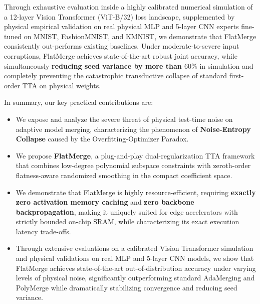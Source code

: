 Through exhaustive evaluation inside a highly calibrated numerical simulation of a 12-layer Vision Transformer (ViT-B/32) loss landscape, supplemented by physical empirical validation on real physical MLP and 5-layer CNN experts fine-tuned on MNIST, FashionMNIST, and KMNIST, we demonstrate that FlatMerge consistently out-performs existing baselines. 
Under moderate-to-severe input corruptions, FlatMerge achieves state-of-the-art robust joint accuracy, while simultaneously \textbf{reducing seed variance by more than $60\%$} in simulation and completely preventing the catastrophic transductive collapse of standard first-order TTA on physical weights.

In summary, our key practical contributions are:
\begin{itemize}
    \item We expose and analyze the severe threat of physical test-time noise on adaptive model merging, characterizing the phenomenon of \textbf{Noise-Entropy Collapse} caused by the Overfitting-Optimizer Paradox.
    \item We propose \textbf{FlatMerge}, a plug-and-play dual-regularization TTA framework that combines low-degree polynomial subspace constraints with zeroth-order flatness-aware randomized smoothing in the compact coefficient space.
    \item We demonstrate that FlatMerge is highly resource-efficient, requiring \textbf{exactly zero activation memory caching} and \textbf{zero backbone backpropagation}, making it uniquely suited for edge accelerators with strictly bounded on-chip SRAM, while characterizing its exact execution latency trade-offs.
    \item Through extensive evaluations on a calibrated Vision Transformer simulation and physical validations on real MLP and 5-layer CNN models, we show that FlatMerge achieves state-of-the-art out-of-distribution accuracy under varying levels of physical noise, significantly outperforming standard AdaMerging and PolyMerge while dramatically stabilizing convergence and reducing seed variance.
\end{itemize}
